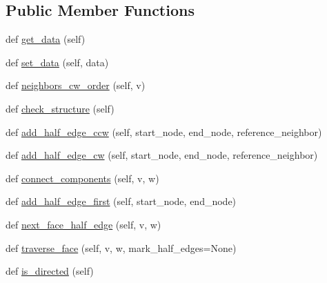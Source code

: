 \subsection*{Public Member Functions}
\begin{DoxyCompactItemize}
\item 
def \hyperlink{classnetworkx_1_1algorithms_1_1planarity_1_1PlanarEmbedding_a23df90920ee302d2f8a5a0b93e352fa2}{get\+\_\+data} (self)
\item 
def \hyperlink{classnetworkx_1_1algorithms_1_1planarity_1_1PlanarEmbedding_af42aa6cf4751eb81f7439c1f04b36e74}{set\+\_\+data} (self, data)
\item 
def \hyperlink{classnetworkx_1_1algorithms_1_1planarity_1_1PlanarEmbedding_a22bee82f35b6940d51353ef5d6a92690}{neighbors\+\_\+cw\+\_\+order} (self, v)
\item 
def \hyperlink{classnetworkx_1_1algorithms_1_1planarity_1_1PlanarEmbedding_a05c1cfdd3a6c1ea0720a12bdae0681a7}{check\+\_\+structure} (self)
\item 
def \hyperlink{classnetworkx_1_1algorithms_1_1planarity_1_1PlanarEmbedding_a83162c25d4361f39d128074422677ef0}{add\+\_\+half\+\_\+edge\+\_\+ccw} (self, start\+\_\+node, end\+\_\+node, reference\+\_\+neighbor)
\item 
def \hyperlink{classnetworkx_1_1algorithms_1_1planarity_1_1PlanarEmbedding_a7076b5d10c8076b752010b799d49acc6}{add\+\_\+half\+\_\+edge\+\_\+cw} (self, start\+\_\+node, end\+\_\+node, reference\+\_\+neighbor)
\item 
def \hyperlink{classnetworkx_1_1algorithms_1_1planarity_1_1PlanarEmbedding_a49f661cc1da51d624ea821680adc7229}{connect\+\_\+components} (self, v, w)
\item 
def \hyperlink{classnetworkx_1_1algorithms_1_1planarity_1_1PlanarEmbedding_a05923dc85b14af72865ae50d366fc95d}{add\+\_\+half\+\_\+edge\+\_\+first} (self, start\+\_\+node, end\+\_\+node)
\item 
def \hyperlink{classnetworkx_1_1algorithms_1_1planarity_1_1PlanarEmbedding_a9bca15383a6ad062a1b614046fcfe314}{next\+\_\+face\+\_\+half\+\_\+edge} (self, v, w)
\item 
def \hyperlink{classnetworkx_1_1algorithms_1_1planarity_1_1PlanarEmbedding_a86753a214cd378f66e4c6c3badba79c0}{traverse\+\_\+face} (self, v, w, mark\+\_\+half\+\_\+edges=None)
\item 
def \hyperlink{classnetworkx_1_1algorithms_1_1planarity_1_1PlanarEmbedding_a33736436ddce67cafd7effe227676773}{is\+\_\+directed} (self)
\end{DoxyCompactItemize}


